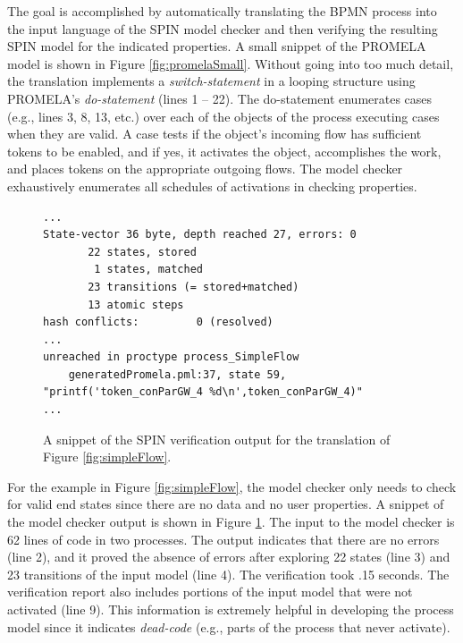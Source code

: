 \documentclass[11pt,twocolumn]{article}
\begin{document}
The goal is accomplished by automatically translating the BPMN process into the input language of the SPIN model checker and then verifying the resulting SPIN model for the indicated properties. A small snippet of the PROMELA model is shown in Figure \ref{fig:promelaSmall}. Without going into too much detail, the translation implements a \emph{switch-statement} in a looping structure using PROMELA's \emph{do-statement} (lines 1 -- 22). The do-statement enumerates cases (e.g., lines 3, 8, 13, etc.) over each of the objects of the process executing cases when they are valid.  A case tests if the object's incoming flow has sufficient tokens to be enabled, and if yes, it activates the object, accomplishes the work, and places tokens on the appropriate outgoing flows. The model checker exhaustively enumerates all schedules of activations in checking properties. 

\begin{figure}[t]
\begin{center}
\begin{lstlisting}
...
State-vector 36 byte, depth reached 27, errors: 0
       22 states, stored
        1 states, matched
       23 transitions (= stored+matched)
       13 atomic steps
hash conflicts:         0 (resolved)
...
unreached in proctype process_SimpleFlow
	generatedPromela.pml:37, state 59, "printf('token_conParGW_4 %d\n',token_conParGW_4)"
...
\end{lstlisting}
\end{center}
\caption{A snippet of the SPIN verification output for the translation of Figure \ref{fig:simpleFlow}.}
\label{fig:spinOutputSmall}
\end{figure}

For the example in Figure \ref{fig:simpleFlow}, the model checker only needs to check for valid end states since there are no data and no user properties. A snippet of the model checker output is shown in Figure \ref{fig:spinOutputSmall}. The input to the model checker is 62 lines of code in two processes. The output indicates that there are no errors (line 2), and it proved the absence of errors after exploring 22 states (line 3) and 23 transitions of the input model (line 4). The verification took .15 seconds. The verification report also includes portions of the input model that were not activated (line 9). This information is extremely helpful in developing the process model since it indicates \emph{dead-code} (e.g., parts of the process that never activate). 
\end{document}
